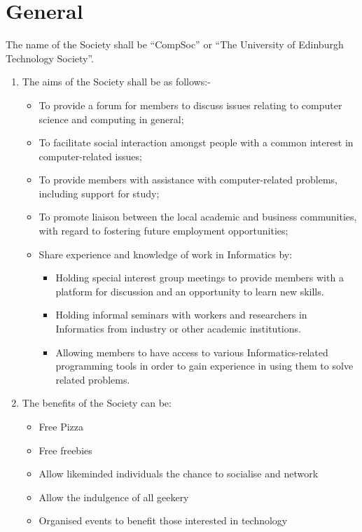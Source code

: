 \section{General}

The name of the Society shall be ``CompSoc'' or ``The University of
Edinburgh Technology Society''.

\begin{enumerate}
  \item The aims of the Society shall be as follows:-
    \begin{itemize}
      \item To provide a forum for members to discuss issues relating to computer science and computing in general;
      \item To facilitate social interaction amongst people with a common interest in computer-related issues;
      \item To provide members with assistance with computer-related problems, including support for study;
      \item To promote liaison between the local academic and business communities, with regard to fostering future employment opportunities;
      \item Share experience and knowledge of work in Informatics by:
        \begin{itemize}
          \item Holding special interest group meetings to provide members with a platform for discussion and an opportunity to learn new skills.
          \item Holding informal seminars with workers and researchers in Informatics from industry or other academic institutions.
          \item Allowing members to have access to various Informatics-related programming tools in order to gain experience in using them to solve related problems.
        \end{itemize}
    \end{itemize}


  \item The benefits of the Society can be:
    \begin{itemize}
      \item Free Pizza
      \item Free freebies
      \item Allow likeminded individuals the chance to socialise and network
      \item Allow the indulgence of all geekery
      \item Organised events to benefit those interested in technology
    \end{itemize}



\end{enumerate}
